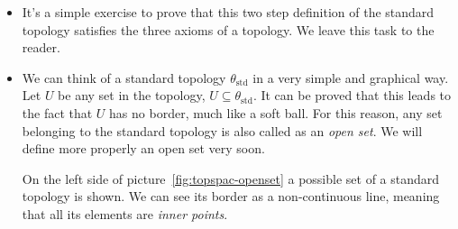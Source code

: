 \begin{itemize}
\begin{figure}[ht]
    \caption{%
      To the left there is a soft ball $B_r(\vvv{p})$, and to the right we find a closed
      ball.}
    \label{fig:topspac-softball-closedball}
  \end{figure}

\item It's a simple exercise to prove that this two step definition of the standard
 topology satisfies the three axioms of a topology. We leave this task to the reader.
  
\item We can think of a standard topology $\theta_{\text{std}}$ in a very simple and
  graphical way.
  Let $U$ be any set in the topology, $U\subseteq\theta_{\text{std}}$. It can be proved
  that this leads to the fact that $U$ has no border, much like a soft ball. For this
  reason, any set belonging to the standard topology is also called as an
  \emph{open set}.
  We will define more properly an open set very soon.

  On the left side of picture~\ref{fig:topspac-openset} a possible set of a standard
  topology is shown. We can see its border as a non-continuous line, meaning that all
  its elements are \emph{inner points}.
  

\end{itemize}
